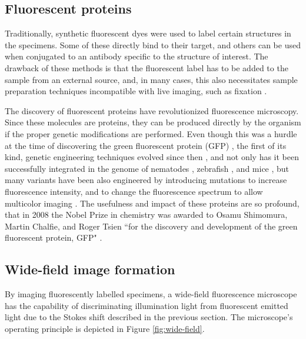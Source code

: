 

  \subsection{Fluorescent proteins}
    Traditionally, synthetic fluorescent dyes were used to label certain structures in the specimens. Some of these directly bind to their target,
    and others can be used when conjugated to an antibody specific to the structure of interest. The drawback of these methods is that the fluorescent label has to be added to the sample from an external source, and, in many cases, this also necessitates sample preparation techniques incompatible with live imaging, such as fixation \cite{bacallao_guiding_1990}.

    The discovery of fluorescent proteins have revolutionized fluorescence microscopy. Since these molecules are proteins, they can be produced directly by the organism if the proper genetic modifications are performed. Even though this was a hurdle at the time of discovering the green fluorescent protein (GFP) \cite{shimomura_extraction_1962}, the first of its kind, genetic engineering techniques evolved since then \cite{prasher_primary_1992}, and not only has it been successfully integrated in the genome of nematodes \cite{chalfie_green_1994}, zebrafish \cite{amsterdam_aequorea_1995}, and mice \cite{okabe_green_1997}, but many variants have been also engineered by introducing mutations to increase fluorescence intensity, and to change the fluorescence spectrum to allow multicolor imaging \cite{heim_wavelength_1994,heim_engineering_1996,cormack_facs-optimized_1996,okabe_green_1997}. The usefulness and impact of these proteins are so profound, that in 2008 the Nobel Prize in chemistry was awarded to Osamu Shimomura, Martin Chalfie, and Roger Tsien ``for the discovery and development of the green fluorescent protein, GFP" \cite{service_three_2008}.


  \subsection{Wide-field image formation}
    By imaging fluorescently labelled specimens, a wide-field fluorescence microscope has the capability of discriminating illumination light from fluorescent emitted light due to the Stokes shift described in the previous section. The microscope's operating principle is depicted in Figure \ref{fig:wide-field}.

